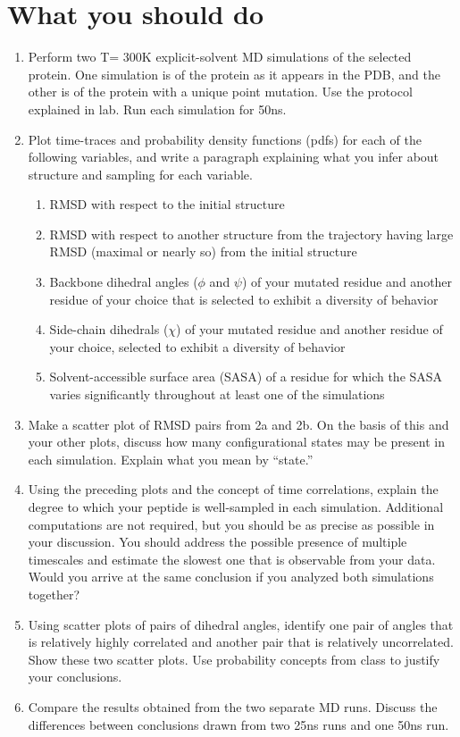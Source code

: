 \documentclass[11pt]{article}
\begin{document}
\section*{What you should do}
\begin{enumerate}
  \item Perform two T= 300K explicit-solvent MD simulations of the selected protein. One simulation is of the protein as it appears in the PDB, and the other is of the protein with a unique point mutation. Use the protocol explained in lab. Run each simulation for 50ns.
  \item Plot time-traces and probability density functions (pdfs) for each of the following variables, and write a paragraph explaining what you infer about structure and sampling for each variable.
    \begin{enumerate}
    \item RMSD with respect to the initial structure
    \item RMSD with respect to another structure from the trajectory having large RMSD (maximal or nearly so) from the initial structure
    \item Backbone dihedral angles ($\phi$ and $\psi$) of your mutated residue and another residue of your choice that is selected to exhibit a diversity of behavior
    \item Side-chain dihedrals ($\chi$) of your mutated residue and another residue of your choice, selected to exhibit a diversity of behavior
    \item Solvent-accessible surface area (SASA) of a residue for which the SASA varies significantly throughout at least one of the simulations
    \end{enumerate}
  \item Make a scatter plot of RMSD pairs from 2a and 2b. On the basis of this and your other plots, discuss how many configurational states may be present in each simulation. Explain what you mean by ``state.''
  \item Using the preceding plots and the concept of time correlations, explain the degree to which your peptide is well-sampled in each simulation. Additional computations are not required, but you should be as precise as possible in your discussion. You should address the possible presence of multiple timescales and estimate the slowest one that is observable from your data. Would you arrive at the same conclusion if you analyzed both simulations together?
  \item Using scatter plots of pairs of dihedral angles, identify one pair of angles that is relatively highly correlated and another pair that is relatively uncorrelated. Show these two scatter plots. Use probability concepts from class to justify your conclusions.
  \item Compare the results obtained from the two separate MD runs. Discuss the differences between conclusions drawn from two 25ns runs and one 50ns run.
\end{enumerate}
\end{document}
